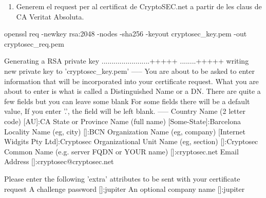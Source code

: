 \documentclass[]{article}
\newenvironment{Shaded}{}{}
\newcommand{\ExtensionTok}[1]{#1}
\newcommand{\NormalTok}[1]{#1}
\newcommand{\StringTok}[1]{\textcolor[rgb]{0.25,0.44,0.63}{#1}}
\providecommand{\tightlist}{%
  \setlength{\itemsep}{0pt}\setlength{\parskip}{0pt}}
\begin{document}
\begin{enumerate}
\def\labelenumi{\arabic{enumi}.}
\setcounter{enumi}{2}
\tightlist
\item
  Generem el request per al certificat de CryptoSEC.net a partir de les
  claus de CA Veritat Absoluta.
\end{enumerate}

\begin{Shaded}
\begin{Highlighting}[]
\ExtensionTok{openssl}\NormalTok{ req -newkey rsa:2048 -nodes -sha256 -keyout cryptosec_key.pem -out cryptosec_req.pem}
\end{Highlighting}
\end{Shaded}

\begin{Shaded}
\begin{Highlighting}[]
\ExtensionTok{Generating}\NormalTok{ a RSA private key}
\ExtensionTok{........................+++++}
\ExtensionTok{........+++++}
\ExtensionTok{writing}\NormalTok{ new private key to }\StringTok{'cryptosec_key.pem'}
\ExtensionTok{-----}
\ExtensionTok{You}\NormalTok{ are about to be asked to enter information that will be incorporated}
\ExtensionTok{into}\NormalTok{ your certificate request.}
\ExtensionTok{What}\NormalTok{ you are about to enter is what is called a Distinguished Name or a DN.}
\ExtensionTok{There}\NormalTok{ are quite a few fields but you can leave some blank}
\ExtensionTok{For}\NormalTok{ some fields there will be a default value,}
\ExtensionTok{If}\NormalTok{ you enter }\StringTok{'.'}\NormalTok{, the field will be left blank.}
\ExtensionTok{-----}
\ExtensionTok{Country}\NormalTok{ Name (2 letter code) [}\ExtensionTok{AU}\NormalTok{]:CA}
\ExtensionTok{State}\NormalTok{ or Province Name (full name) [}\ExtensionTok{Some-State}\NormalTok{]:Barcelona}
\ExtensionTok{Locality}\NormalTok{ Name (eg, city) []:}\ExtensionTok{BCN}
\ExtensionTok{Organization}\NormalTok{ Name (eg, company) [}\ExtensionTok{Internet}\NormalTok{ Widgits Pty Ltd]:Cryptosec}
\ExtensionTok{Organizational}\NormalTok{ Unit Name (eg, section) []:}\ExtensionTok{Cryptosec}
\ExtensionTok{Common}\NormalTok{ Name (e.g. server FQDN or YOUR name) []:}\ExtensionTok{cryptosec.net}
\ExtensionTok{Email}\NormalTok{ Address []:cryptosec@cryptosec.net}

\ExtensionTok{Please}\NormalTok{ enter the following }\StringTok{'extra'}\NormalTok{ attributes}
\ExtensionTok{to}\NormalTok{ be sent with your certificate request}
\ExtensionTok{A}\NormalTok{ challenge password []:jupiter}
\ExtensionTok{An}\NormalTok{ optional company name []:jupiter}
\end{Highlighting}
\end{Shaded}
\end{document}

